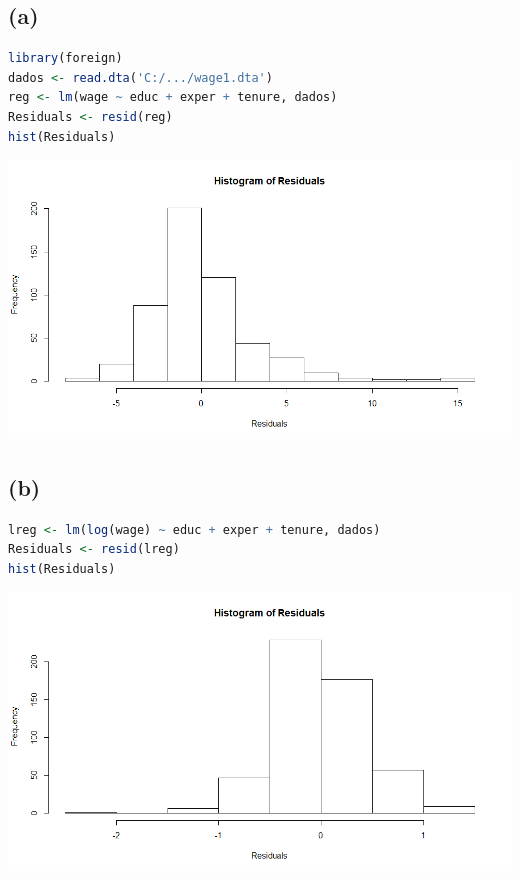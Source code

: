 \documentclass[12pt]{article}
\begin{document}
\subsection*{(a)}
\begin{lstlisting}[language=R]
library(foreign)
dados <- read.dta('C:/.../wage1.dta')
reg <- lm(wage ~ educ + exper + tenure, dados)
Residuals <- resid(reg)
hist(Residuals)
\end{lstlisting}
\begin{center}
	\includegraphics*[scale=0.65]{1.png}
\end{center}

\subsection*{(b)}
\begin{lstlisting}[language=R]
lreg <- lm(log(wage) ~ educ + exper + tenure, dados)
Residuals <- resid(lreg)
hist(Residuals)
\end{lstlisting}

\begin{center}
	\includegraphics*[scale=0.65]{2.png}
\end{center}	
\end{document}
